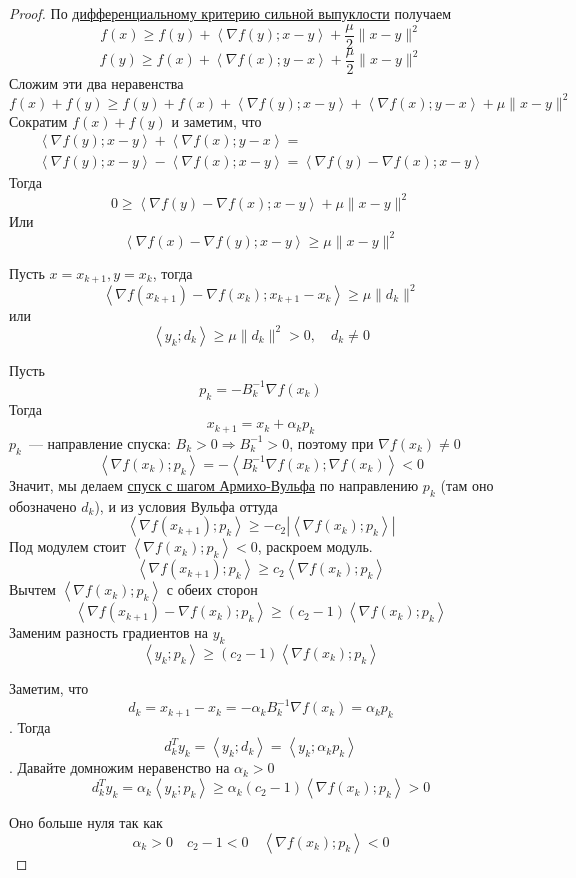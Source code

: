 \begin{proof}
  По \hyperref[note:1B5A3E25-56E8-4D5E-9CF6-E2731DA77604]{дифференциальному критерию сильной выпуклости} получаем
  \[
  f(x) \ge f(y) + \left\langle \nabla f(y); x-y \right\rangle + \frac{\mu}{2} \|x-y\|^2
  \]
  \[
  f(y) \ge f(x) + \left\langle \nabla f(x); y-x \right\rangle + \frac{\mu}{2} \|x-y\|^2
  \]
  Сложим эти два неравенства
  \[
  f(x) + f(y) \ge f(y) + f(x) + \left\langle \nabla f(y); x-y \right\rangle + \left\langle \nabla f(x); y-x \right\rangle + \mu \|x-y\|^2
  \]
  Сократим $f(x) + f(y)$ и заметим, что
  \begin{multline*}
  \left\langle \nabla f(y); x-y \right\rangle + \left\langle \nabla f(x); y-x \right\rangle = \\
   \left\langle \nabla f(y); x-y \right\rangle - \left\langle \nabla f(x); x-y \right\rangle =
  \left\langle \nabla f(y) - \nabla f(x); x-y \right\rangle
  \end{multline*}
  Тогда
  \[
  0 \ge \left\langle \nabla f(y) - \nabla f(x); x-y \right\rangle + \mu \|x-y\|^2
  \]
  Или
  \[
  \left\langle \nabla f(x) - \nabla f(y); x-y \right\rangle \ge \mu \|x-y\|^2
  \]

  Пусть $x = x_{k+1}, y=x_k$, тогда
  \[
  \left\langle \nabla f(x_{k+1}) - \nabla f(x_k); x_{k+1}-x_k \right\rangle \ge \mu \|d_k\|^2
  \]
  или
  \[
  \left\langle y_k; d_k \right\rangle \ge \mu \|d_k\|^2 > 0,\quad d_k \ne 0
  \]

  Пусть
  \[
  p_k = - B_k^{-1}\nabla f(x_k)
  \]
  Тогда
  \[
  x_{k+1} = x_k + \alpha_k p_k
  \]
  $p_k$~--- направление спуска: $B_k > 0 \Rightarrow B_k^{-1} > 0$, поэтому при $\nabla f(x_k) \ne 0$
  \[
  \left\langle \nabla f(x_k); p_k \right\rangle = - \left\langle B_k^{-1} \nabla f(x_k); \nabla f(x_k) \right\rangle < 0
  \]
  Значит, мы делаем \hyperref[note:DF0CC2BA-9234-47D3-8988-7A1DAFC9B114]{спуск с шагом Армихо-Вульфа} по направлению $p_k$ (там оно обозначено $d_k$), и из условия Вульфа оттуда
  \[
  \left\langle \nabla f(x_{k+1}); p_k \right\rangle \ge  - c_2 \left| \left\langle \nabla f(x_k); p_k \right\rangle \right|
  \]
  Под модулем стоит $\left\langle \nabla f(x_k); p_k \right\rangle < 0$, раскроем модуль.
  \[
  \left\langle \nabla f(x_{k+1}); p_k \right\rangle \ge c_2 \left\langle \nabla f(x_k); p_k \right\rangle
  \]
  Вычтем $\left\langle \nabla f(x_k); p_k \right\rangle$ с обеих сторон
  \[
  \left\langle \nabla f(x_{k+1}) - \nabla f(x_k); p_k \right\rangle \ge (c_2-1) \left\langle \nabla f(x_k); p_k \right\rangle
  \]
  Заменим разность градиентов на $y_k$
  \[
  \left\langle y_k; p_k \right\rangle \ge (c_2-1) \left\langle \nabla f(x_k); p_k \right\rangle
  \]

  Заметим, что
  \[d_k = x_{k+1} - x_k = -\alpha_kB_k^{-1}\nabla f(x_k) = \alpha_kp_{k}\].
  Тогда
  \[d^T_ky_k = \left\langle y_k; d_k \right\rangle = \left\langle y_k; \alpha_kp_k \right\rangle\].
  Давайте домножим неравенство на $\alpha_k > 0$
  \[
  d_k^Ty_k = \alpha_k\left\langle y_k; p_k \right\rangle \ge  \alpha_k(c_2-1) \left\langle \nabla f(x_k); p_k \right\rangle > 0
  \]

  Оно больше нуля так как
  \[
  \alpha_k > 0\quad c_2-1 < 0\quad \left\langle \nabla f(x_k);p_k \right\rangle < 0
  \]
\end{proof}
